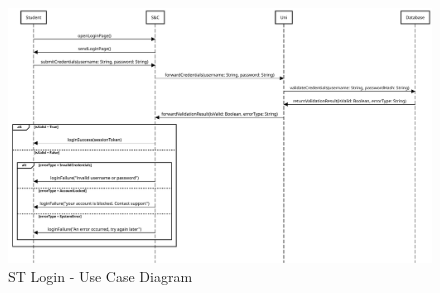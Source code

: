 \begin{figure}[H]
    \centering
    \includegraphics[width=1.0\textwidth]{Images/UC_1.pdf}
    \caption{ST Login - Use Case Diagram}
    \label{fig:use-case-diagram-1}
\end{figure}


